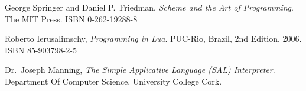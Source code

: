 \begin{thebibliography}{9}

  George Springer and Daniel P.\ Friedman,
  \emph{Scheme and the Art of Programming}.
  The MIT Press.
  ISBN 0-262-19288-8

  Roberto Ierusalimschy,
  \emph{Programming in Lua}.
  PUC-Rio, Brazil,
  2nd Edition,
  2006.
  ISBN 85-903798-2-5
  
  Dr.\ Joseph Manning,
  \emph{The Simple Applicative Language (SAL) Interpreter}.
  Department Of Computer Science,
  University College Cork.
  
\end{thebibliography}
